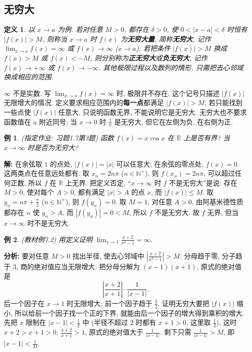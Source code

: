 \documentclass[UTF8,openany]{ctexbook}
\theoremstyle{chinesetextbook}
\newtheorem{definition}{定义}[section]
\newtheorem{example}{例}[section]
\newenvironment{cnsolution}{\par\indent\textbf{解:} \ignorespaces}{\par}
\begin{document}
\subsection{无穷大}
\begin{definition}
以 $x\to a$ 为例. 若对任意 $M>0$, 都存在 $\delta>0$, 使 $0<|x-a|<\delta$ 时恒有 $|f(x)|>M$, 则称当 $x\to a$ 时 $f(x)$ 为\textbf{无穷大量}, 简称\textbf{无穷大}, 记作 $\displaystyle\lim_{x\to a}f(x)=\infty$ 或 $f(x)\to\infty$ ($x\to a$). 若把条件 $|f(x)|>M$ 换成 $f(x)>M$ 或 $f(x)<-M$, 则分别称为\textbf{正无穷大}或\textbf{负无穷大}, 记作 $f(x)\to+\infty$ 或 $f(x)\to-\infty$. 其他极限过程以及数列的情形, 只需把去心邻域换成相应的范围.
\end{definition}
$\infty$ 不是实数. 写 $\displaystyle\lim_{x\to a}f(x)=\infty$ 时, 极限并不存在, 这个记号只描述 $|f(x)|$ 无限增大的情况. 定义要求相应范围内的\textbf{每一点}都满足 $|f(x)|>M$; 若只能找到一些点使 $|f(x)|$ 任意大, 只说明函数无界, 不能说明它是无穷大. 无穷大也不要求函数值在 $a$ 附近同号: 当 $x\to0$ 时 $\displaystyle\frac1x$ 是无穷大, 但它在左侧为负, 在右侧为正.
\begin{example}
\textnormal{(指定作业: 习题1.7第3题)} 函数 $f(x)=x\cos x$ 在 $\mathbb R$ 上是否有界? 当 $x\to\infty$ 时是否为无穷大?
\end{example}
\begin{cnsolution}
在余弦取 $1$ 的点处, $|f(x)|=|x|$ 可以任意大; 在余弦的零点处, $f(x)=0$. 这两类点在任意远处都有. 取 $x_n=2n\pi$ ($n\in\mathbb N^+$), 则 $f(x_n)=2n\pi$, 可以超过任何正数, 所以 $f$ 在 $\mathbb R$ 上无界. 把定义否定, “$x\to\infty$ 时 $f$ 不是无穷大”是说: 存在 $M>0$, 使对每个 $A>0$, 都有满足 $|x|>A$ 的点 $x$, 而 $|f(x)|\le M$. 取 $\displaystyle y_n=n\pi+\frac\pi2$ ($n\in\mathbb N^+$), 则 $f(y_n)=0$. 取 $M=1$, 对任意 $A>0$, 由阿基米德性质都存在 $n$ 使 $y_n>A$, 而 $|f(y_n)|=0<M$, 所以 $f$ 不是无穷大. 故 $f$ 无界, 但当 $x\to\infty$ 时不是无穷大.
\end{cnsolution}
\begin{example}
\textnormal{(教材例7.2)} 用定义证明 $\displaystyle\lim_{x\to1}\frac{x+2}{x^2-1}=\infty$.
\end{example}
\par\indent\textbf{分析:} 要对任意 $M>0$ 找出半径, 使去心邻域中 $\displaystyle\left|\frac{x+2}{x^2-1}\right|>M$. 分母趋于零, 分子趋于 $3$, 商的绝对值应当无限增大. 把分母分解为 $(x-1)(x+1)$, 原式的绝对值是
\[
\left|\frac{x+2}{x+1}\right|\cdot\frac1{|x-1|}.
\]
后一个因子在 $x\to1$ 时无限增大; 前一个因子趋于 $\displaystyle\frac32$. 证明无穷大要把 $|f(x)|$ 缩小, 所以给前一个因子找一个正的下界, 就能由后一个因子的增大得到乘积的增大. 先把 $x$ 限制在 $\displaystyle|x-1|<\frac12$ 中 (半径不超过 $2$ 时都有 $x+1>0$, 这里取 $\displaystyle\frac12$), 这时 $x+2>x+1>0$, $\displaystyle\frac{x+2}{x+1}>1$, 原式的绝对值大于 $\displaystyle\frac1{|x-1|}$. 剩下只需 $\displaystyle\frac1{|x-1|}>M$, 即 $\displaystyle|x-1|<\frac1M$.
\end{document}
